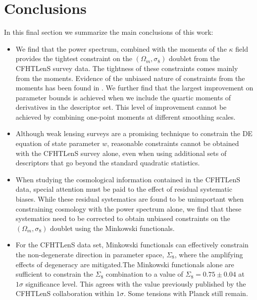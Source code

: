 \documentclass[reprint,aps,prd,superscriptaddress,showkeys,showpacs]{revtex4-1}
\begin{document}
\section{Conclusions}

In this final section we summarize the main conclusions of this work:

\begin{itemize}

\item We find that the power spectrum, combined with the moments of
  the $\kappa$ field provides the tightest constraint on the
  $(\Omega_m,\sigma_8)$ doublet from the CFHTLenS survey data. The
  tightness of these constraints comes mainly from the
  moments. Evidence of the unbiased nature of constraints from the
  moments has been found in \citep{PetriSpurious}. We further find
  that the largest improvement on parameter bounds is achieved when we
  include the quartic moments of derivatives in the descriptor set. This
  level of improvement cannot be achieved by combining one-point
  moments at different smoothing scales.

\item Although weak lensing surveys are a promising technique to
  constrain the DE equation of state parameter $w$, reasonable
  constraints cannot be obtained with the CFHTLenS survey alone, even
  when using additional sets of descriptors that go beyond the
  standard quadratic statistics.

\item When studying the cosmological information contained in the
  CFHTLenS data, special attention must be paid to the effect of
  residual systematic biases. While these residual systematics are
  found to be unimportant when constraining cosmology with the power
  spectrum alone, we find that these systematics need to be corrected
  to obtain unbiased constraints on the $(\Omega_m,\sigma_8)$ doublet
  using the Minkowski functionals.

\item For the CFHTLenS data set, Minkowski functionals can effectively
  constrain the non-degenerate direction in parameter space,
  $\Sigma_8$, where the amplifying effects of degeneracy are
  mitigated.The Minkowski functionals alone are sufficient to
  constrain the $\Sigma_8$ combination to a value of
  $\Sigma_8=0.75\pm0.04$ at $1\sigma$ significance level. This agrees
  with the value previously published by the CFHTLenS collaboration
  within $1\sigma$. Some tensions with Planck \citep{PlanckXVI2013}
  still remain.

\end{itemize}
\end{document}
